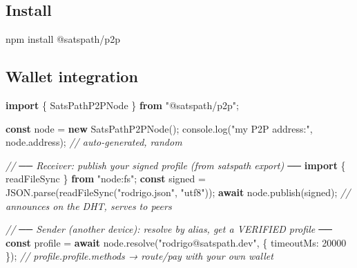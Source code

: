 \documentclass[
]{article}
\newenvironment{Shaded}{}{}
\newcommand{\AttributeTok}[1]{\textcolor[rgb]{0.49,0.56,0.16}{#1}}
\newcommand{\BuiltInTok}[1]{\textcolor[rgb]{0.00,0.50,0.00}{#1}}
\newcommand{\CommentTok}[1]{\textcolor[rgb]{0.38,0.63,0.69}{\textit{#1}}}
\newcommand{\ControlFlowTok}[1]{\textcolor[rgb]{0.00,0.44,0.13}{\textbf{#1}}}
\newcommand{\DataTypeTok}[1]{\textcolor[rgb]{0.56,0.13,0.00}{#1}}
\newcommand{\DecValTok}[1]{\textcolor[rgb]{0.25,0.63,0.44}{#1}}
\newcommand{\ExtensionTok}[1]{#1}
\newcommand{\FunctionTok}[1]{\textcolor[rgb]{0.02,0.16,0.49}{#1}}
\newcommand{\ImportTok}[1]{\textcolor[rgb]{0.00,0.50,0.00}{\textbf{#1}}}
\newcommand{\KeywordTok}[1]{\textcolor[rgb]{0.00,0.44,0.13}{\textbf{#1}}}
\newcommand{\NormalTok}[1]{#1}
\newcommand{\OperatorTok}[1]{\textcolor[rgb]{0.40,0.40,0.40}{#1}}
\newcommand{\StringTok}[1]{\textcolor[rgb]{0.25,0.44,0.63}{#1}}
\begin{document}
\hypertarget{install}{%
\subsection{Install}\label{install}}

\begin{Shaded}
\begin{Highlighting}[]
\ExtensionTok{npm}\NormalTok{ install @satspath/p2p}
\end{Highlighting}
\end{Shaded}

\hypertarget{wallet-integration}{%
\subsection{Wallet integration}\label{wallet-integration}}

\begin{Shaded}
\begin{Highlighting}[]
\ImportTok{import}\NormalTok{ \{ SatsPathP2PNode \} }\ImportTok{from} \StringTok{"@satspath/p2p"}\OperatorTok{;}

\KeywordTok{const}\NormalTok{ node }\OperatorTok{=} \KeywordTok{new} \FunctionTok{SatsPathP2PNode}\NormalTok{()}\OperatorTok{;}
\BuiltInTok{console}\OperatorTok{.}\FunctionTok{log}\NormalTok{(}\StringTok{"my P2P address:"}\OperatorTok{,}\NormalTok{ node}\OperatorTok{.}\AttributeTok{address}\NormalTok{)}\OperatorTok{;} \CommentTok{// auto{-}generated, random}

\CommentTok{// ── Receiver: publish your signed profile (from \textasciigrave{}satspath export\textasciigrave{}) ──}
\ImportTok{import}\NormalTok{ \{ readFileSync \} }\ImportTok{from} \StringTok{"node:fs"}\OperatorTok{;}
\KeywordTok{const}\NormalTok{ signed }\OperatorTok{=} \BuiltInTok{JSON}\OperatorTok{.}\FunctionTok{parse}\NormalTok{(}\FunctionTok{readFileSync}\NormalTok{(}\StringTok{"rodrigo.json"}\OperatorTok{,} \StringTok{"utf8"}\NormalTok{))}\OperatorTok{;}
\ControlFlowTok{await}\NormalTok{ node}\OperatorTok{.}\FunctionTok{publish}\NormalTok{(signed)}\OperatorTok{;} \CommentTok{// announces on the DHT, serves to peers}

\CommentTok{// ── Sender (another device): resolve by alias, get a VERIFIED profile ──}
\KeywordTok{const}\NormalTok{ profile }\OperatorTok{=} \ControlFlowTok{await}\NormalTok{ node}\OperatorTok{.}\FunctionTok{resolve}\NormalTok{(}\StringTok{"rodrigo@satspath.dev"}\OperatorTok{,}\NormalTok{ \{ }\DataTypeTok{timeoutMs}\OperatorTok{:} \DecValTok{20000}\NormalTok{ \})}\OperatorTok{;}
\CommentTok{// profile.profile.methods → route/pay with your own wallet}
\end{Highlighting}
\end{Shaded}
\end{document}
